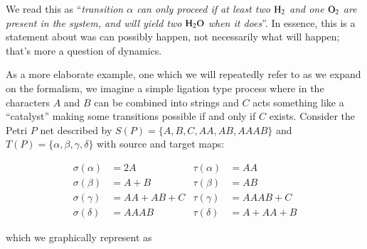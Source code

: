 \documentclass[aps,prd,onecolumn,nofootinbib,letterpaper,preprintnumbers,superscriptaddress,eqsecnum]{revtex4}
\theoremstyle{definition}
\newcommand{\red}[1]{{\color{red}#1}}
\begin{document}
We read this as ``\textit{transition $\alpha$ can only proceed if at least two $\ce{H_2}$ and one $\ce{O_2}$ are present in the system, and will yield two $\ce{H_2O}$ when it does}''.
In essence, this is a statement about was can possibly happen, not necessarily what will happen; that's more a question of dynamics.

As a more elaborate example, one which we will repeatedly refer to as we expand on the formalism, we imagine a simple ligation type process where in the characters $A$ and $B$ can be combined into strings and $C$ acts something like a \red{``catalyst''} making some transitions possible if and only if $C$ exists.
Consider the Petri $P$ net described by $S(P) = \{ A, B, C, AA, AB, AAAB \}$ and $T(P) = \{ \alpha, \beta, \gamma, \delta \}$ with source and target maps:

\begin{align*}
    \sigma(\alpha) &= 2A           & \tau(\alpha) &= AA         \\
    \sigma(\beta)  &= A + B        & \tau(\beta)  &= AB         \\
    \sigma(\gamma) &= AA + AB + C  & \tau(\gamma) &= AAAB + C   \\
    \sigma(\delta) &= AAAB         & \tau(\delta) &= A + AA + B
\end{align*}

which we graphically represent as
\end{document}

